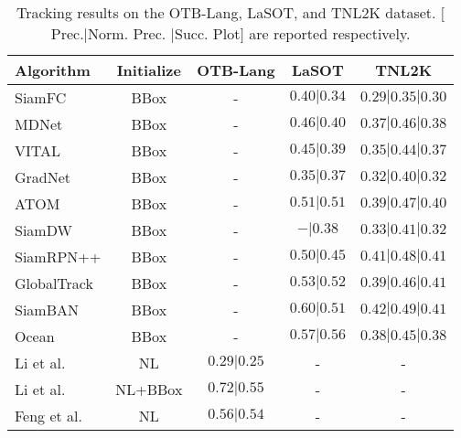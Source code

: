 \documentclass[final]{cvpr}
\begin{document}
\begin{table}
\center
\scriptsize 
\caption{Tracking results on the OTB-Lang, LaSOT, and TNL2K dataset. $[$Prec.$|$Norm. Prec. $|$Succ. Plot$]$ are reported respectively.} \label{Benchmarkresults}
\begin{tabular}{l|c|c|c|c}
\hline \toprule [0.8 pt]
\textbf{Algorithm}    									&\textbf{Initialize}       		 &\textbf{OTB-Lang}      &\textbf{LaSOT}     			&\textbf{TNL2K}        \\
\hline 
SiamFC \cite{bertinetto2016siamfc} 			&BBox        			  	&-       						&$0.40|0.34$      						&$0.29|0.35|0.30$         			 \\	
MDNet \cite{Nam2015Learning} 					&BBox        			  	&-       						&$0.46|0.40$      						&$0.37|0.46|0.38$         			 \\	
VITAL \cite{SongYiBing_2018_CVPR} 		&BBox        			  	&-       						&$0.45|0.39$      						&$0.35|0.44|0.37$         			 \\	
GradNet \cite{Li_2019_ICCV} 					&BBox        			  	&-       						&$0.35|0.37$      						&$0.32|0.40|0.32$         			 \\	
ATOM \cite{danelljan2019atom} 					&BBox        			  	&-       						&$0.51|0.51$      						&$0.39|0.47|0.40$         			 \\	
SiamDW \cite{zhipeng2019deeper}				&BBox        			  	&-       						&$-|0.38$      							&$0.33|0.41|0.32$         			 \\		
SiamRPN++ \cite{li2018siamrpn++}			&BBox        			  	&-       						&$0.50|0.45$      						&$0.41|0.48|0.41$         			 \\		
GlobalTrack \cite{huang2019globaltrack}	&BBox        			  	&-       						&$0.53|0.52$      						&$0.39|0.46|0.41$         			 \\			
SiamBAN \cite{chen2020siamban} 				&BBox        			  	&-       						&$0.60|0.51$      						&$0.42|0.49|0.41$         			 \\	
Ocean \cite{zhang2020ocean} 						&BBox        			  	&-       						&$0.57|0.56$      						&$0.38|0.45|0.38$         			 \\
\hline \toprule [0.8 pt]
Li et al. \cite{li2017tracking}					&NL        			  	&$0.29|0.25$       		&-     						&-        			 \\
Li et al. \cite{li2017tracking}					&NL+BBox        	&$0.72|0.55$       		&-     						&-        			 \\
\hline 
Feng et al. \cite{feng2019robust} 			&NL        				&$0.56|0.54$       		&-     						&-        			 \\

\end{tabular}
\end{table}
\end{document}
